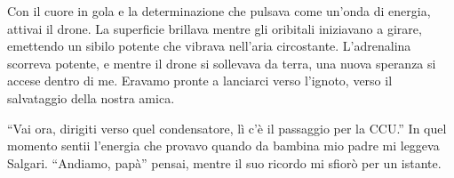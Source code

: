 Con il cuore in gola e la determinazione che pulsava come un'onda di energia, attivai il drone. La superficie  brillava mentre gli oribitali iniziavano a girare, emettendo un sibilo potente che vibrava nell'aria circostante. L'adrenalina scorreva potente, e mentre il drone si sollevava da terra, una nuova speranza si accese dentro di me. Eravamo pronte a lanciarci verso l'ignoto, verso il salvataggio della nostra amica.

\begin{dialogue}
 \enquote{Vai ora, dirigiti verso quel condensatore, lì c'è il passaggio per la CCU.} In quel momento sentii l'energia che provavo quando da bambina mio padre mi leggeva Salgari. ``Andiamo, papà'' pensai, mentre il suo ricordo mi sfiorò per un istante.
\end{dialogue}
